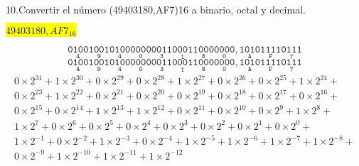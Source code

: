 \documentclass[a4paper,12pt]{article}
\begin{document}
	10.Convertir el número (49403180,AF7)16 a binario, octal y decimal. 
	\begin{center}
	\colorbox{yellow}{{$49403180,AF7_{16}$}} \\ \vspace{0.3cm}

	\[
	\mathtt{
		\underset{4}{\boxed{\mathtt{0100}}}
		\underset{9}{\boxed{\mathtt{1001}}}
		\underset{4}{\boxed{\mathtt{0100}}}
		\underset{0}{\boxed{\mathtt{0000}}}
		\underset{3}{\boxed{\mathtt{0011}}}
		\underset{1}{\boxed{\mathtt{0001}}}
		\underset{8}{\boxed{\mathtt{1000}}}
		\underset{0}{\boxed{\mathtt{0000}}}
		\underset{}{\boxed{\mathtt{,}}}
		\underset{A}{\boxed{\mathtt{1010}}}
		\underset{F}{\boxed{\mathtt{1111}}}
		\underset{7}{\boxed{\mathtt{0111}}}
	}	
	\]
	\[
	\mathtt{
		\underset{4}{\boxed{\mathtt{0100}}}
		\underset{9}{\boxed{\mathtt{1001}}}
		\underset{4}{\boxed{\mathtt{0100}}}
		\underset{0}{\boxed{\mathtt{0000}}}
		\underset{3}{\boxed{\mathtt{0011}}}
		\underset{1}{\boxed{\mathtt{0001}}}
		\underset{8}{\boxed{\mathtt{1000}}}
		\underset{0}{\boxed{\mathtt{0000}}}
		\underset{}{\boxed{\mathtt{,}}}
		\underset{A}{\boxed{\mathtt{1010}}}
		\underset{F}{\boxed{\mathtt{1111}}}
		\underset{7}{\boxed{\mathtt{0111}}}
	}	
	\]
	\begin{multline*}
		0\times2^{31} + 1\times2^{30} + 0\times2^{29} + 0\times2^{28} + 1\times2^{27} + 0\times2^{26} + 0\times2^{25} + 1\times2^{24} +	\\0\times2^{23} + 1\times2^{22} + 0\times2^{21} + 0\times2^{20} + 0\times2^{19} + 0\times2^{18} + 0\times2^{17} + 0\times2^{16} +	\\0\times2^{15} + 0\times2^{14} + 1\times2^{13} + 1\times2^{12} + 0\times2^{11} + 0\times2^{10} + 0\times2^{9} + 1\times2^{8} +\\1\times2^{7} + 0\times2^{6} + 0\times2^{5} + 0\times2^{4} + 0\times2^{3} + 0\times2^{2} + 0\times2^{1} + 0\times2^{0} + \\1\times2^{-1} + 0\times2^{-2} + 1\times2^{-3} + 0\times2^{-4} + 1\times2^{-5} + 1\times2^{-6} + 1\times2^{-7} + 1\times2^{-8} +\\0\times2^{-9} + 1\times2^{-10} + 1\times2^{-11} + 1\times2^{-12}
	\end{multline*}
\end{center}	
\end{document}
